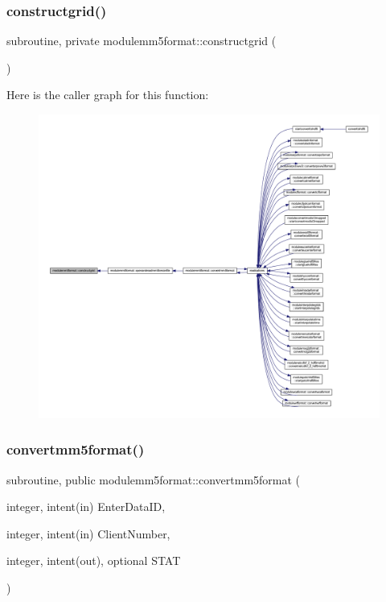 \subsubsection{\texorpdfstring{constructgrid()}{constructgrid()}}
{\footnotesize\ttfamily subroutine, private modulemm5format\+::constructgrid (\begin{DoxyParamCaption}{ }\end{DoxyParamCaption})\hspace{0.3cm}{\ttfamily [private]}}

Here is the caller graph for this function\+:\nopagebreak
\begin{figure}[H]
\begin{center}
\leavevmode
\includegraphics[width=350pt]{namespacemodulemm5format_aaf7b2df73bb7e6d30db2af2b3493559a_icgraph}
\end{center}
\end{figure}
\mbox{\label{namespacemodulemm5format_a1a626b0d9d1e86eb446e37da6e498536}} 
\subsubsection{\texorpdfstring{convertmm5format()}{convertmm5format()}}
{\footnotesize\ttfamily subroutine, public modulemm5format\+::convertmm5format (\begin{DoxyParamCaption}\item[{integer, intent(in)}]{Enter\+Data\+ID,  }\item[{integer, intent(in)}]{Client\+Number,  }\item[{integer, intent(out), optional}]{S\+T\+AT }\end{DoxyParamCaption})}

